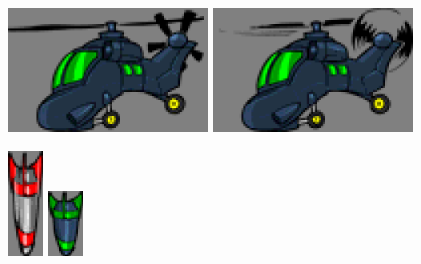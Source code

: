 \documentclass[10pt]{book}
\begin{document}
\begin{CJK}{UTF8}{gkai}
\begin{center}
\includegraphics[width=150pt]{previews/nightstrike_1-HELI-00.png}
\includegraphics[width=150pt]{previews/nightstrike_1-HELI-01.png}
\end{center}

\begin{center}
\includegraphics[width=0.07\textwidth]{previews/nightstrike_0-MISSILE_A-00.png}
\includegraphics[width=0.07\textwidth]{previews/nightstrike_0-MISSILE_C-00.png}
\end{center}


\end{CJK}
\end{document}
